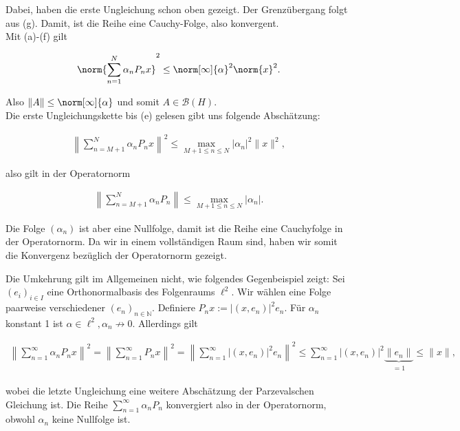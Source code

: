 \begin{solution}
Dabei, haben die erste Ungleichung schon oben gezeigt.
Der Grenzübergang folgt aus (g).
Damit, ist die Reihe eine Cauchy-Folge, also konvergent. \\

Mit (a)-(f) gilt

\begin{align*}
    \norm{\sum_{n = 1}^N \alpha_n P_n x}^2
    \leq
    \norm[\infty]{\alpha}^2 \norm{x}^2.
\end{align*}

Also $\|A\| \leq \norm[\infty]{\alpha}$ und somit $A \in \mathcal{B}(H)$. \\

Die erste Ungleichungskette bis (e) gelesen gibt uns folgende Abschätzung:

\begin{align*}
\left\| \sum_{n = M+1}^N \alpha_n P_n x \right\|^2 \leq \max_{M+1 \leq n \leq N} |\alpha_n|^2 \|x\|^2,
\end{align*}

also gilt in der Operatornorm

\begin{align*}
\left\| \sum_{n = M+1}^N \alpha_n P_n \right\| \leq \max_{M+1 \leq n \leq N} |\alpha_n|.
\end{align*}

Die Folge $(\alpha_n)$ ist aber eine Nullfolge, damit ist die Reihe eine Cauchyfolge in der Operatornorm. Da wir in einem vollständigen Raum sind, haben wir somit die Konvergenz bezüglich der Operatornorm gezeigt.

Die Umkehrung gilt im Allgemeinen nicht, wie folgendes Gegenbeispiel zeigt: Sei $(e_i)_{i \in I}$ eine Orthonormalbasis des Folgenraums $\ell^2.$ Wir wählen eine Folge paarweise verschiedener $(e_n)_{n \in \mathbb{N}}.$ Definiere $P_nx := |(x, e_n)|^2 e_n.$ Für $\alpha_n$ konstant 1 ist $\alpha \in \ell^2, \alpha_n \not \rightarrow 0$. Allerdings gilt

\begin{align*}
    \left\| \sum_{n = 1}^{\infty} \alpha_n P_n x \right\|^2 =
    \left\| \sum_{n = 1}^{\infty} P_n x \right\|^2 = \left\| \sum_{n = 1}^{\infty} |(x, e_n)|^2 e_n \right\|^2 \leq \sum_{n = 1}^{\infty} |(x, e_n)|^2 \underbrace{\|e_n\|}_{\substack{= 1}} \leq \|x\|,
\end{align*}

wobei die letzte Ungleichung eine weitere Abschätzung der Parzevalschen Gleichung ist. Die Reihe $\sum_{n = 1}^{\infty} \alpha_n P_n$ konvergiert also in der Operatornorm, obwohl $\alpha_n$ keine Nullfolge ist.


\end{solution}
